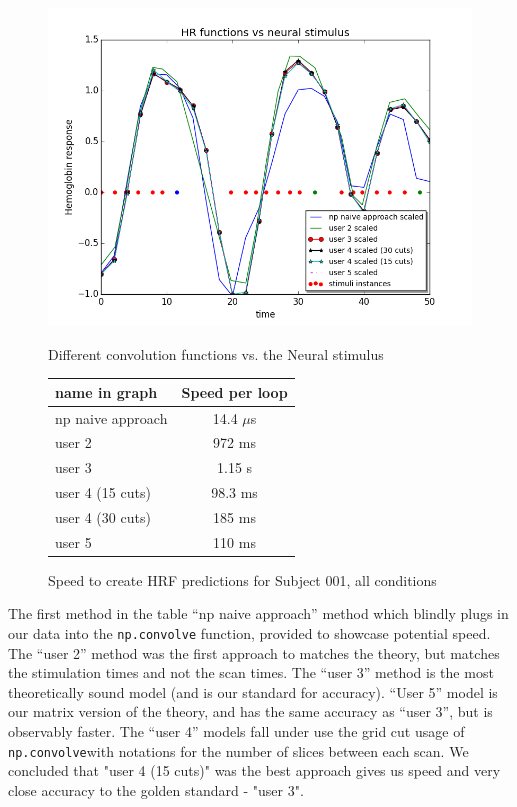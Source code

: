 \begin{figure}[ht]
\centering
	\begin{minipage}[b]{0.45\linewidth}
		\centering
		\includegraphics[width=.8\linewidth]{../images/convolution_vs_neural_stimulus}
		\caption{\scriptsize{Different convolution functions vs. the Neural stimulus}}
		\label{fig:convolution}

	\end{minipage}
\quad
	\begin{minipage}[b]{0.45\linewidth}
		\centering
		\begin{tabular}{|l | c|}
		\hline
		name in graph       & Speed per loop \\
		\hline
		np naive approach & 14.4 $\mu$s  \\
		user 2     		    & 972 ms  \\
		user 3     		    & 1.15 s    \\
		user 4 (15 cuts)      & 98.3 ms \\
		user 4 (30 cuts)      & 185 ms  \\
		user 5     	 	    & 110 ms   \\
		\hline
		\end{tabular}
		\vspace{5mm}
		\caption{\scriptsize{Speed to create HRF predictions for Subject 001, 
		all conditions}}
		\label{table:convolution}
	\end{minipage}
\end{figure}

The first method in the table ``np naive approach'' method which blindly plugs 
in our data into the \texttt{np.convolve} function, provided to showcase 
potential speed. The ``user 2'' method  was the first approach to matches the 
theory, but matches the stimulation times and not the scan times. The ``user 
3'' method is the most theoretically sound model (and is our standard for 
accuracy). ``User 5'' model  is our matrix version of the theory, and has the 
same accuracy as ``user 3'', but is observably faster. The ``user 4'' models 
fall under use the grid cut usage of \texttt{np.convolve}with notations for the
number of slices between each scan. We concluded that "user 4 (15 cuts)" was 
the best approach gives us speed and very close accuracy to the golden standard
- "user 3".






